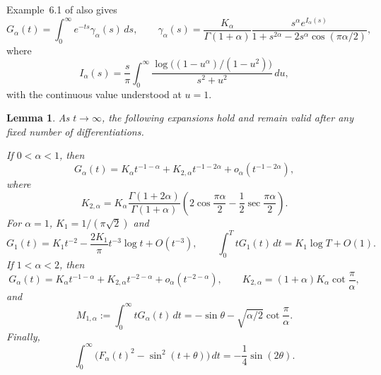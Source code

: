 \documentclass[11pt]{amsart}
\numberwithin{equation}{section}
\newtheorem{lemma}[lemma]{Lemma}
\theoremstyle{remark}
\begin{document}
Example~6.1 of \cite{KwasnickiHalfLine} also gives
\begin{equation}\label{eq:gamma}
 G_\alpha(t)=\int_0^\infty e^{-ts}\gamma_\alpha(s)\,ds,
 \qquad
 \gamma_\alpha(s)=\frac{K_\alpha}{\Gamma(1+\alpha)}
 \frac{s^\alpha e^{I_\alpha(s)}}
 {1+s^{2\alpha}-2s^\alpha\cos(\pi\alpha/2)},
\end{equation}
where
\begin{equation}\label{eq:I}
 I_\alpha(s)=\frac{s}{\pi}\int_0^\infty
 \frac{\log\!\bigl((1-u^\alpha)/(1-u^2)\bigr)}{s^2+u^2}\,du,
\end{equation}
with the continuous value understood at $u=1$.

\begin{lemma}\label{lem:halfline-data}
As $t\to\infty$, the following expansions hold and remain valid after any
fixed number of differentiations.

If $0<\alpha<1$, then
\begin{equation}\label{eq:Gsmall}
 G_\alpha(t)=K_\alpha t^{-1-\alpha}
 +K_{2,\alpha}t^{-1-2\alpha}+o_\alpha(t^{-1-2\alpha}),
\end{equation}
where
\begin{equation}\label{eq:K2small}
 K_{2,\alpha}=K_\alpha\frac{\Gamma(1+2\alpha)}{\Gamma(1+\alpha)}
 \left(2\cos\frac{\pi\alpha}{2}
 -\frac12\sec\frac{\pi\alpha}{2}\right).
\end{equation}
For $\alpha=1$, $K_1=1/(\pi\sqrt2)$ and
\begin{equation}\label{eq:Gcritical}
 G_1(t)=K_1t^{-2}-\frac{2K_1}{\pi}t^{-3}\log t+O(t^{-3}),
 \qquad
 \int_0^TtG_1(t)\,dt=K_1\log T+O(1).
\end{equation}
If $1<\alpha<2$, then
\begin{equation}\label{eq:Glarge}
 G_\alpha(t)=K_\alpha t^{-1-\alpha}
 +K_{2,\alpha}t^{-2-\alpha}+o_\alpha(t^{-2-\alpha}),
 \qquad
 K_{2,\alpha}=(1+\alpha)K_\alpha\cot\frac{\pi}{\alpha},
\end{equation}
and
\begin{equation}\label{eq:M1}
 M_{1,\alpha}:=\int_0^\infty tG_\alpha(t)\,dt
 =-\sin\theta-\sqrt{\alpha/2}\cot\frac{\pi}{\alpha}.
\end{equation}
Finally,
\begin{equation}\label{eq:halfline-norm-identity}
 \int_0^\infty
 \bigl(F_\alpha(t)^2-\sin^2(t+\theta)\bigr)\,dt
 =-\frac14\sin(2\theta).
\end{equation}
\end{lemma}
\end{document}
